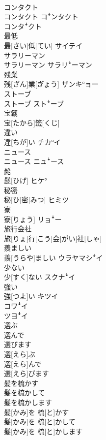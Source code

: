 \documentclass[8pt]{extreport}
\begin{document}
\begin{CJK}{UTF8}{min}
\\	コンタクト	
\\	コンタクト	コꜜンタクト 
\\	コンタꜜクト
\\	最低	
\\	最[さい]低[てい]	サイテイ
\\	サラリーマン	
\\	サラリーマン	サラリꜜーマン
\\	残業	
\\	残[ざん]業[ぎょう]	ザンキ°ョー
\\	ストーブ	
\\	ストーブ	ストꜜーブ
\\	宝籤	
\\	宝[たから]籤[くじ]	
\\	違い	
\\	違[ちが]い	チカ°イ
\\	ニュース	
\\	ニュース	ニュꜜース
\\	髭	
\\	髭[ひげ]	ヒケ°
\\	秘密	
\\	秘[ひ]密[みつ]	ヒミツ
\\	寮	
\\	寮[りょう]	リョꜜー
\\	旅行会社	
\\	旅[りょ]行[こう]会[がい]社[しゃ]	
\\	羨ましい	
\\	羨[うらや]ましい	ウラヤマシꜜイ
\\	少ない	
\\	少[すく]ない	スクナꜜイ
\\	強い	
\\	強[つよ]い	キツイ 
\\	コワꜜイ 
\\	ツヨꜜイ
\\	選ぶ 
\\	選んで 
\\	選びます	
\\	選[えら]ぶ 
\\	選[えら]んで 
\\	選[えら]びます	
\\	髪を梳かす 
\\	髪を梳かして 
\\	髪を梳かします	
\\	髪[かみ]を 梳[と]かす 
\\	髪[かみ]を 梳[と]かして 
\\	髪[かみ]を 梳[と]かします	

\end{CJK}
\end{document}
